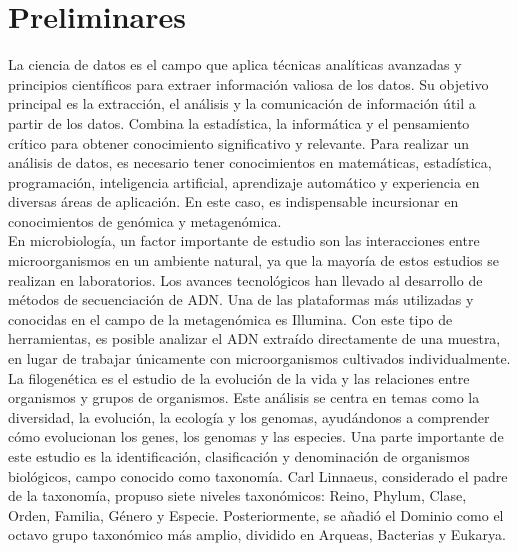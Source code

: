\chapter{Preliminares}
La ciencia de datos es el campo que aplica técnicas analíticas avanzadas y principios científicos para extraer información valiosa de los datos. Su objetivo principal es la extracción, el análisis y la comunicación de información útil a partir de los datos. Combina la estadística, la informática y el pensamiento crítico para obtener conocimiento significativo y relevante. Para realizar un análisis de datos, es necesario tener conocimientos en matemáticas, estadística, programación, inteligencia artificial, aprendizaje automático y experiencia en diversas áreas de aplicación. En este caso, es indispensable incursionar en conocimientos de genómica y metagenómica.\\

En microbiología, un factor importante de estudio son las interacciones entre microorganismos en un ambiente natural, ya que la mayoría de estos estudios se realizan en laboratorios. Los avances tecnológicos han llevado al desarrollo de métodos de secuenciación de ADN. Una de las plataformas más utilizadas y conocidas en el campo de la metagenómica es Illumina. Con este tipo de herramientas, es posible analizar el ADN extraído directamente de una muestra, en lugar de trabajar únicamente con microorganismos cultivados individualmente.\\

La filogenética es el estudio de la evolución de la vida y las relaciones entre organismos y grupos de organismos. Este análisis se centra en temas como la diversidad, la evolución, la ecología y los genomas, ayudándonos a comprender cómo evolucionan los genes, los genomas y las especies. Una parte importante de este estudio es la identificación, clasificación y denominación de organismos biológicos, campo conocido como taxonomía. Carl Linnaeus, considerado el padre de la taxonomía, propuso siete niveles taxonómicos: Reino, Phylum, Clase, Orden, Familia, Género y Especie. Posteriormente, se añadió el Dominio como el octavo grupo taxonómico más amplio, dividido en Arqueas, Bacterias y Eukarya.\\

